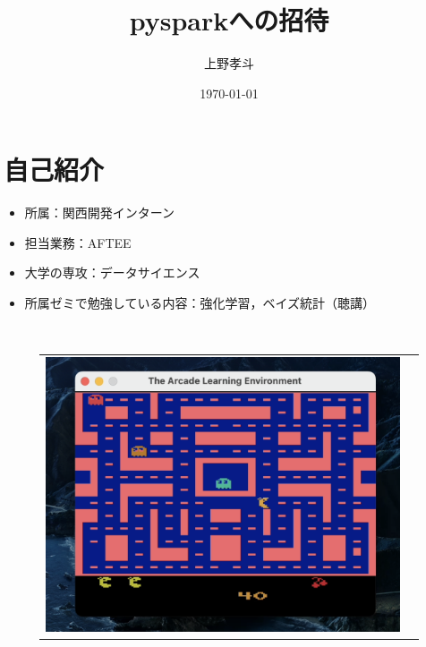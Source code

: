 \documentclass[aspectratio=169,dvipdfmx,xcolor=dvipsnames]{beamer}
\title[short title]{pysparkへの招待} %
\subtitle{}
\author{上野孝斗}
\institute[NTU] %
{
    株式会社ネットプロテクションズ \\
    関西開発インターン生\\
}
\date{\today} %
\theoremstyle{definition}
\theoremstyle{definition}
\theoremstyle{definition}
\theoremstyle{definition}
\begin{document}
\begin{frame}
  \maketitle
\end{frame}

\begin{frame}{}
  \tableofcontents
\end{frame}

\section{自己紹介}
\begin{frame}
  \begin{itemize}
    \item 所属：関西開発インターン
    \item 担当業務：AFTEE
    \item 大学の専攻：データサイエンス
    \item 所属ゼミで勉強している内容：強化学習，ベイズ統計（聴講）
  \end{itemize}
  \,\,\,\,\,\,\,\,
  \begin{figure}
    \begin{tabular}{cc}
      \begin{minipage}{0.45\hsize}
        \centering
        \includegraphics[scale=0.12]{Pacman.png}
      \end{minipage} &
      \begin{minipage}{0.45\hsize}
        \centering

\end{minipage}
\end{tabular}
\end{figure}
\end{frame}
\end{document}
